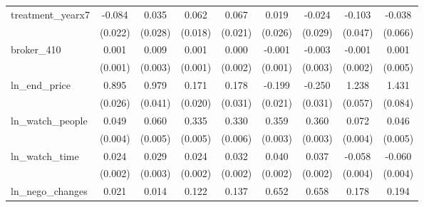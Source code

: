 {\begin{tabular}{l*{8}{c}}
\addlinespace
treatment\_yearx7&      -0.084\sym{***}&       0.035         &       0.062\sym{***}&       0.067\sym{***}&       0.019         &      -0.024         &      -0.103\sym{**} &      -0.038         \\
            &     (0.022)         &     (0.028)         &     (0.018)         &     (0.021)         &     (0.026)         &     (0.029)         &     (0.047)         &     (0.066)         \\
\addlinespace
broker\_410  &       0.001         &       0.009\sym{***}&       0.001         &       0.000         &      -0.001         &      -0.003         &      -0.001         &       0.001         \\
            &     (0.001)         &     (0.003)         &     (0.001)         &     (0.002)         &     (0.001)         &     (0.003)         &     (0.002)         &     (0.005)         \\
\addlinespace
ln\_end\_price&       0.895\sym{***}&       0.979\sym{***}&       0.171\sym{***}&       0.178\sym{***}&      -0.199\sym{***}&      -0.250\sym{***}&       1.238\sym{***}&       1.431\sym{***}\\
            &     (0.026)         &     (0.041)         &     (0.020)         &     (0.031)         &     (0.021)         &     (0.031)         &     (0.057)         &     (0.084)         \\
\addlinespace
ln\_watch\_people&       0.049\sym{***}&       0.060\sym{***}&       0.335\sym{***}&       0.330\sym{***}&       0.359\sym{***}&       0.360\sym{***}&       0.072\sym{***}&       0.046\sym{***}\\
            &     (0.004)         &     (0.005)         &     (0.005)         &     (0.006)         &     (0.003)         &     (0.003)         &     (0.004)         &     (0.005)         \\
\addlinespace
ln\_watch\_time&       0.024\sym{***}&       0.029\sym{***}&       0.024\sym{***}&       0.032\sym{***}&       0.040\sym{***}&       0.037\sym{***}&      -0.058\sym{***}&      -0.060\sym{***}\\
            &     (0.002)         &     (0.003)         &     (0.002)         &     (0.002)         &     (0.002)         &     (0.002)         &     (0.004)         &     (0.004)         \\
\addlinespace
ln\_nego\_changes&       0.021\sym{***}&       0.014         &       0.122\sym{***}&       0.137\sym{***}&       0.652\sym{***}&       0.658\sym{***}&       0.178\sym{***}&       0.194\sym{***}\\

\end{tabular}}
